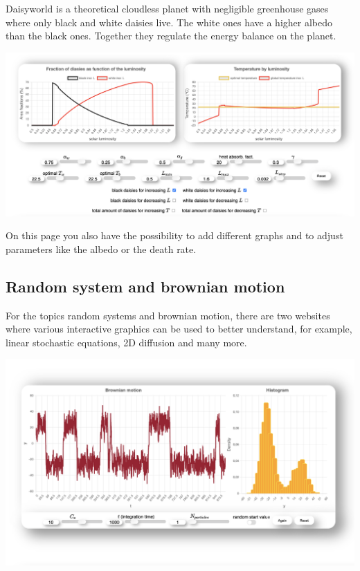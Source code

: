 \documentclass[a0,portrait]{a0poster}
\begin{document}
\begin{multicols}{3}
Daisyworld is a theoretical cloudless planet with negligible greenhouse gases where only black and white daisies live. The white ones have a higher albedo than the black ones. Together they regulate the energy balance on the planet.
\begin{center}\vspace{1cm}
\includegraphics[width=1\linewidth]{daisyworld.png}
\end{center}\vspace{1cm}

On this page you also have the possibility to add different graphs and to adjust parameters like the albedo or the death rate.

\subsection{Random system and brownian motion}
For the topics random systems and brownian motion, there are two websites where various interactive graphics can be used to better understand, for example, linear stochastic equations, 2D diffusion and many more.

\begin{center}\vspace{1cm}
\includegraphics[width=0.8\linewidth]{bm2.png}
\end{center}\vspace{1cm}


\end{multicols}
\end{document}

